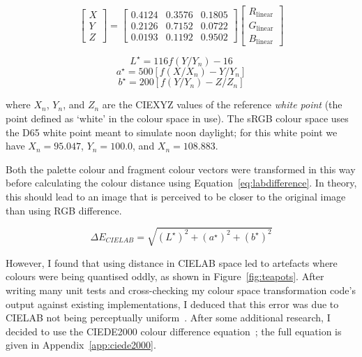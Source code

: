 \documentclass[12pt,twoside,notitlepage]{report}
\begin{document}
\begin{equation}\begin{bmatrix}
X\\Y\\Z\end{bmatrix}=
\begin{bmatrix}
0.4124&0.3576&0.1805\\
0.2126&0.7152&0.0722\\
0.0193&0.1192&0.9502
\end{bmatrix}
\begin{bmatrix}
R_\mathrm{linear}\\ 
G_\mathrm{linear}\\ 
B_\mathrm{linear}
\end{bmatrix}\end{equation}

\begin{equation}L^{\star} = 116f(Y/Y_{n}) - 16\end{equation}
\begin{equation}a^{\star} = 500[f(X/X_{n}) - Y/Y_{n}]\end{equation}
\begin{equation}b^{\star} = 200[f(Y/Y_{n}) - Z/Z_{n}]\end{equation}

where $X_{n}$, $Y_{n}$, and $Z_{n}$ are the CIEXYZ values of the reference \textit{white point} (the point defined as `white' in the colour space in use). The sRGB colour space uses the D65 white point meant to simulate noon daylight; for this white point we have $X_{n} = 95.047$, $Y_{n} = 100.0$, and $X_{n} = 108.883$.

Both the palette colour and fragment colour vectors were transformed in this way before calculating the colour distance using Equation~\ref{eq:labdifference}. In theory, this should lead to an image that is perceived to be closer to the original image than using RGB difference.

\begin{equation}
\label{eq:labdifference}
\Delta E_{CIELAB} = \sqrt{(L^{\star})^2 + (a^{\star})^2 + (b^{\star})^2}
\end{equation}

However, I found that using distance in CIELAB space led to artefacts where colours were being quantised oddly, as shown in Figure~\ref{fig:teapots}. After writing many unit tests and cross-checking my colour space transformation code's output against existing implementations, I deduced that this error was due to CIELAB not being perceptually uniform~\cite{COTE:COTE376}. After some additional research, I decided to use the CIEDE2000 colour difference equation~\cite{CIE:2001:142-2001}; the full equation is given in Appendix~\ref{app:ciede2000}.
\end{document}

